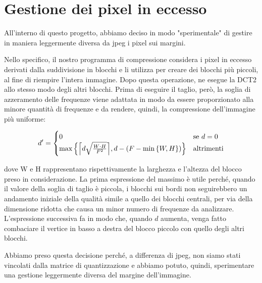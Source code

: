 \section{Gestione dei pixel in eccesso}\label{sec:border}

All'interno di questo progetto, abbiamo deciso in modo "sperimentale" di gestire in maniera leggermente diversa da jpeg i pixel sui margini.

Nello specifico, il nostro programma di compressione considera i pixel in eccesso derivati dalla suddivisione in blocchi e li utilizza per creare dei blocchi più piccoli, al fine di riempire l'intera immagine. Dopo questa operazione, ne esegue la DCT2 allo stesso modo degli altri blocchi. Prima di eseguire il taglio, però, la soglia di azzeramento delle frequenze viene adattata in modo da essere proporzionato alla minore quantità di frequenze e da rendere, quindi, la compressione dell'immagine più uniforme:

\begin{equation}
d' = \begin{cases}
	0 &\text{se $d=0$}\\
	\max \left\{  \ceil*{d  \sqrt{ \frac{W \cdot H}{F^{2}}}}, d - \left(F - \min \left\{W , H \right\}\right)   \right \} &\text{altrimenti}
 \end{cases}
 \label{eq:d}
\end{equation}

dove W e H rappresentano rispettivamente la larghezza e l'altezza del blocco preso in considerazione.
La prima espressione del massimo è utile perché, quando il valore della soglia di taglio è piccola, i blocchi sui bordi  non seguirebbero un andamento iniziale della qualità simile a quello dei blocchi centrali, per via della dimensione ridotta che causa un minor numero di frequenze da analizzare. L'espressione successiva fa in modo che, quando $d$ aumenta, venga fatto combaciare il vertice in basso a destra del blocco piccolo con quello degli altri blocchi.

Abbiamo preso questa decisione perché, a differenza di jpeg, non siamo stati vincolati dalla matrice di quantizzazione e abbiamo potuto, quindi, sperimentare una gestione leggermente diversa del margine dell'immagine.


